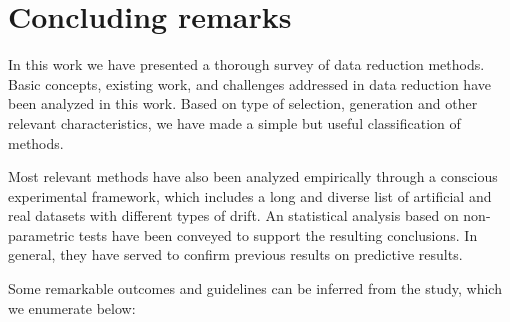 \documentclass[preprint,12pt]{elsarticle}
\begin{document}

\section{Concluding remarks}
\label{sec:conclusions}

In this work we have presented a thorough survey of data reduction methods. Basic concepts, existing work, and challenges addressed in data reduction have been analyzed in this work. Based on type of selection, generation and other relevant characteristics, we have made a simple but useful classification of methods. 

Most relevant methods have also been analyzed empirically through a conscious experimental framework, which includes a long and diverse list of artificial and real datasets with different types of drift. An statistical analysis based on non-parametric tests have been conveyed to support the resulting conclusions. In general, they have served to confirm previous results on predictive results. 

Some remarkable outcomes and guidelines can be inferred from the study, which we enumerate below:
\end{document}

